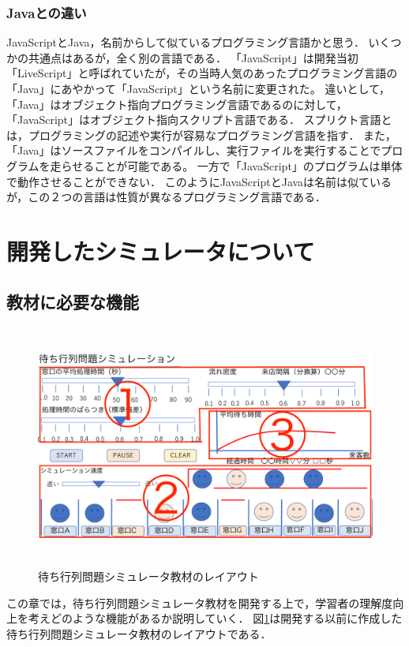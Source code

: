 \documentclass[12pt,a4j]{ltjsarticle}
\begin{document}
\subsubsection{Javaとの違い}
JavaScriptとJava，名前からして似ているプログラミング言語かと思う．
いくつかの共通点はあるが，全く別の言語である．
「JavaScript」は開発当初「LiveScript」と呼ばれていたが，その当時人気のあったプログラミング言語の「Java」にあやかって「JavaScript」という名前に変更された。
違いとして，「Java」はオブジェクト指向プログラミング言語であるのに対して，「JavaScript」はオブジェクト指向スクリプト言語である．
スプリクト言語とは，プログラミングの記述や実行が容易なプログラミング言語を指す．
また，「Java」はソースファイルをコンパイルし、実行ファイルを実行することでプログラムを走らせることが可能である。
一方で「JavaScript」のプログラムは単体で動作させることができない．
このようにJavaScriptとJavaは名前は似ているが，この２つの言語は性質が異なるプログラミング言語である．
\clearpage

\section{開発したシミュレータについて}
\subsection{教材に必要な機能} 
\begin{figure}[h]
\begin{center}
\includegraphics[height = 80mm ]{figures/simulator_layout.pdf}
\caption{待ち行列問題シミュレータ教材のレイアウト}
\label{fig:layout}
\end{center}
\end{figure}
この章では，待ち行列問題シミュレータ教材を開発する上で，学習者の理解度向上を考えどのような機能があるか説明していく．
図\ref{fig:layout}は開発する以前に作成した待ち行列問題シミュレータ教材のレイアウトである．
\end{document}
